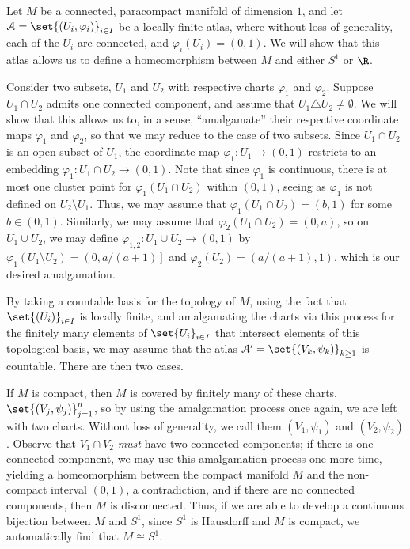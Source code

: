 \documentclass[10pt]{mypackage}
\begin{document}
\begin{solution}
  Let $M$ be a connected, paracompact manifold of dimension $1$, and let $\mathcal{A} = \set{\left( U_i,\varphi_i \right)}_{i\in I}$ be a locally finite atlas, where without loss of generality, each of the $U_i$ are connected, and $\varphi_i\left( U_i \right) = (0,1)$. We will show that this atlas allows us to define a homeomorphism between $M$ and either $S^{1}$ or $\R$.\newline

  Consider two subsets, $U_1$ and $U_2$ with respective charts $\varphi_1$ and $\varphi_2$. Suppose $U_1\cap U_2$ admits one connected component, and assume that $U_1\triangle U_2\neq \emptyset$. We will show that this allows us to, in a sense, ``amalgamate'' their respective coordinate maps $\varphi_1$ and $\varphi_2$, so that we may reduce to the case of two subsets. Since $U_1\cap U_2$ is an open subset of $U_1$, the coordinate map $\varphi_1\colon U_1\rightarrow (0,1)$ restricts to an embedding $\varphi_1\colon U_1\cap U_2\rightarrow (0,1)$. Note that since $\varphi_{1}$ is continuous, there is at most one cluster point for $\varphi_1\left( U_1\cap U_2 \right)$ within $(0,1)$, seeing as $\varphi_1$ is not defined on $U_2\setminus U_1$. Thus, we may assume that $\varphi_{1}\left( U_1\cap U_2 \right) = (b,1)$ for some $b\in (0,1)$. Similarly, we may assume that $\varphi_2\left( U_1\cap U_2 \right) = (0,a)$, so on $U_1\cup U_2$, we may define $\varphi_{1,2}\colon U_1\cup U_2\rightarrow (0,1)$ by $\varphi_{1}\left( U_1\setminus U_2 \right) = \left(0,a/(a+1)\right]$ and $\varphi_{2}\left( U_2 \right) = \left(a/(a+1),1\right)$, which is our desired amalgamation.\newline

  By taking a countable basis for the topology of $M$, using the fact that $\set{\left( U_i \right)}_{i\in I}$ is locally finite, and amalgamating the charts via this process for the finitely many elements of $\set{U_i}_{i\in I}$ that intersect elements of this topological basis, we may assume that the atlas $\mathcal{A}' = \set{\left( V_k,\psi_k \right)}_{k\geq 1}$ is countable. There are then two cases.\newline

  If $M$ is compact, then $M$ is covered by finitely many of these charts, $\set{\left( V_j,\psi_j \right)}_{j=1}^{n}$, so by using the amalgamation process once again, we are left with two charts. Without loss of generality, we call them $\left( V_1,\psi_1 \right)$ and $\left( V_2,\psi_2 \right)$. Observe that $V_1\cap V_2$  \textit{must} have two connected components; if there is one connected component, we may use this amalgamation process one more time, yielding a homeomorphism between the compact manifold $M$ and the non-compact interval $\left( 0,1 \right)$, a contradiction, and if there are no connected components, then $M$ is disconnected. Thus, if we are able to develop a continuous bijection between $M$ and $S^{1}$, since $S^{1}$ is Hausdorff and $M$ is compact, we automatically find that $M \cong S^{1}$.\newline


\end{solution}
\end{document}
